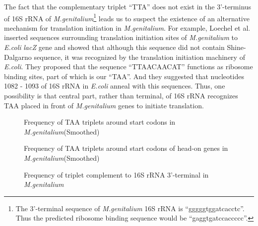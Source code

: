 The fact that the complementary triplet ``TTA'' does not exist in the
3'-terminus of 16S rRNA of {\it M.genitalium}\footnote{The 3'-terminal
sequence of {\it M.genitalium} 16S rRNA is ``gggggtggatcacctc''. Thus
the predicted ribosome binding sequence would be
``gaggtgatccaccccc''.} leads us to suspect the existence of an
alternative mechanism for translation initiation in {\it
M.genitalium}. For example, Loechel et al.\cite{mglabel12} inserted
sequences surrounding translation initiation sites of {\it
M.genitalium} to {\it E.coli} {\it lacZ} gene and showed that although
this sequence did not contain Shine-Dalgarno sequence, it was
recognized by the translation initiation machinery of {\it
E.coli}. They proposed that the sequence ``TTAACAACAT'' functions as
ribosome binding sites, part of which is our ``TAA''. And they
suggested that nucleotides 1082 - 1093 of 16S rRNA in {\it E.coli}
anneal with this sequences. Thus, one possibility is that central
part, rather than terminal, of 16S rRNA recognizes TAA placed in front
of {\it M.genitalium} genes to initiate translation.

\begin{figure}
\begin{center}
\end{center}
\caption{Frequency of TAA triplets around start codons in {\it
M.genitalium}(Smoothed)}
\label{mg_taa}
\end{figure}

\begin{figure}
\begin{center}
\end{center}
\caption{Frequency of TAA triplets around start codons of
head-on genes in {\it M.genitalium}(Smoothed)}
\label{mg_taa_op}
\end{figure}

\begin{figure}
\begin{center}
\end{center}
\caption{Frequency of triplet complement to 16S rRNA 3'-terminal in {\it M.genitalium}}
\label{mg_16Scomp_tri}
\end{figure}



